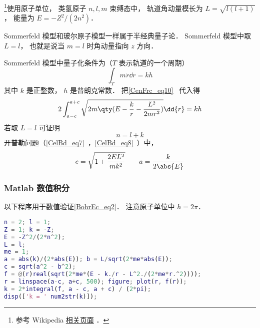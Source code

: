 
\begin{issues}
\issueDraft
\end{issues}


\footnote{参考 Wikipedia \href{https://en.wikipedia.org/wiki/Old_quantum_theory}{相关页面}
．}使用原子单位， 类氢原子 $n,l,m$ 束缚态中， 轨道角动量模长为 $L = \sqrt{l(l+1)}$， 能量为 $E = -Z^2/(2n^2)$．

Sommerfeld 模型和玻尔原子模型一样属于半经典量子论． Sommerfeld 模型中取 $L = l$， 也就是说当 $m = l$ 时角动量指向 $z$ 方向．

Sommerfeld 模型中量子化条件为（$T$ 表示轨道的一个周期）
\begin{equation}
\int_T m\dot r \dd{r} = kh
\end{equation}
其中 $k$ 是正整数， $h$ 是普朗克常数． 把\autoref{CenFrc_eq10}~ 代入得
\begin{equation}\label{BohrEc_eq1}
2\int_{a-c}^{a+c} \sqrt{2m\qty(E - \frac{k}{r} - \frac{L^2}{2mr^2})} \dd{r} = kh
\end{equation}
若取 $L = l$ 可证明
\begin{equation}\label{BohrEc_eq2}
n = l + k
\end{equation}
开普勒问题（\autoref{CelBd_eq7}~，\autoref{CelBd_eq8}~）中，
\begin{equation}
e = \sqrt{1 + \frac{2EL^2}{mk^2}}
\qquad
a = \frac{k}{2\abs{E}}
\end{equation}

\subsubsection{Matlab 数值积分}
以下程序用于数值验证\autoref{BohrEc_eq2}． 注意原子单位中 $h = 2\pi$．
\begin{lstlisting}[language=matlab]
n = 2; l = 1;
Z = 1; k = -Z;
E = -Z^2/(2*n^2);
L = l;
me = 1;
a = abs(k)/(2*abs(E)); b = L/sqrt(2*me*abs(E));
c = sqrt(a^2 - b^2);
f = @(r)real(sqrt(2*me*(E - k./r - L^2./(2*me*r.^2))));
r = linspace(a-c, a+c, 500); figure; plot(r, f(r));
k = 2*integral(f, a - c, a + c) / (2*pi);
disp(['k = ' num2str(k)]);
\end{lstlisting}
